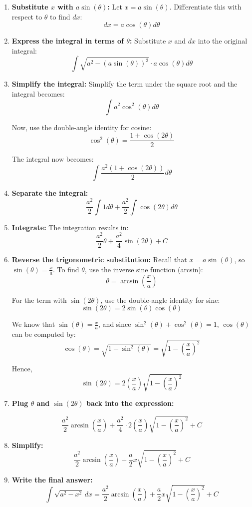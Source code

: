 \begin{enumerate}



\item  \textbf{Substitute \(x\) with \(a\sin(\theta)\):}  Let \(x = a\sin(\theta)\). Differentiate this with respect to \(\theta\) to find \(dx\):
\[dx = a\cos(\theta)d\theta\]

\item  \textbf{Express the integral in terms of \(\theta\):} Substitute \(x\) and \(dx\) into the original integral:
\[\int \sqrt{a^2 - (a\sin(\theta))^2} \cdot a\cos(\theta)d\theta\]

\item  \textbf{Simplify the integral:} Simplify the term under the square root and the integral becomes:
\[\int a^2 \cos^2(\theta) d\theta\]

Now, use the double-angle identity for cosine:
\[\cos^2(\theta) = \frac{1 + \cos(2\theta)}{2}\]

The integral now becomes:
\[\int \frac{a^2(1 + \cos(2\theta))}{2} d\theta\]

\item  \textbf{Separate the integral:}  \[\frac{a^2}{2} \int 1 d\theta + \frac{a^2}{2} \int \cos(2\theta) d\theta\]

\item   \textbf{Integrate:} The integration results in:
\[\frac{a^2}{2} \theta + \frac{a^2}{4} \sin(2\theta) + C\]

\item   \textbf{Reverse the trigonometric substitution:}  Recall that \(x = a\sin(\theta)\), so \(\sin(\theta) = \frac{x}{a}\). To find \(\theta\), use the inverse sine function (arcsin):
\[\theta = \arcsin\left(\frac{x}{a}\right)\]

For the term with \(\sin(2\theta)\), use the double-angle identity for sine:
\[\sin(2\theta) = 2\sin(\theta)\cos(\theta)\]

We know that \(\sin(\theta) = \frac{x}{a}\), and since \(\sin^2(\theta) + \cos^2(\theta) = 1\), \(\cos(\theta)\) can be computed by:
\[\cos(\theta) = \sqrt{1 - \sin^2(\theta)} = \sqrt{1 - \left(\frac{x}{a}\right)^2}\]

Hence,
\[\sin(2\theta) = 2\left(\frac{x}{a}\right)\sqrt{1 - \left(\frac{x}{a}\right)^2}\]

\item   \textbf{Plug \(\theta\) and \(\sin(2\theta)\) back into the expression:}

\[\frac{a^2}{2} \arcsin\left(\frac{x}{a}\right) + \frac{a^2}{4} \cdot 2\left(\frac{x}{a}\right)\sqrt{1 - \left(\frac{x}{a}\right)^2} + C\]

\item   \textbf{Simplify:} \[\frac{a^2}{2} \arcsin\left(\frac{x}{a}\right) + \frac{a}{2} x\sqrt{1 - \left(\frac{x}{a}\right)^2} + C\]

\item   \textbf{Write the final answer:} \[\int \sqrt{a^2 - x^2} \, dx = \frac{a^2}{2} \arcsin\left(\frac{x}{a}\right) + \frac{a}{2} x\sqrt{1 - \left(\frac{x}{a}\right)^2} + C\]

\end{enumerate}

